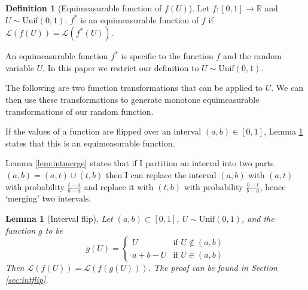 \documentclass[12pt]{article}
\theoremstyle{plain}%
\newtheorem{lemma}[theorem]{Lemma}
\theoremstyle{definition}
\newtheorem{definition}{Definition}[section]
\def\unif{\mathrm{Unif}}
\begin{document}
\begin{definition}[Equimeasurable function of $f(U)$]\label{def:equimeasurable}
	Let $f:[0,1]\to \mathbb{R}$ and $U\sim \unif(0,1)$. $f^*$ is an equimeasurable function of $f$ if $\mathcal{L}(f(U))=\mathcal{L}(f^*(U))$.
\end{definition} 

An equimeasurable function $f^*$ is specific to the function $f$ and the random variable $U$. In this paper we restrict our definition to $U\sim \unif(0,1)$. 

The following are two function transformations that can be applied to $U$. We can then use these transformations to generate monotone equimeasurable transformations of our random function. %

If the values of a function are flipped over an interval $(a,b)\in[0,1]$, Lemma \ref{lem:intflip} states that this is an equimeasurable function.

Lemma \ref{lem:intmerge} states that if I partition an interval into two parts $(a,b)=(a,t)\cup(t,b)$ then I can replace the interval $(a,b)$ with $(a,t)$ with probability $\frac{t-a}{b-a}$ and replace it with $(t,b)$ with probability $\frac{b-t}{b-a}$, hence `merging' two intervals. 
 


\begin{lemma}[Interval flip]\label{lem:intflip}
	Let $(a,b)\subset [0,1]$, $U\sim\unif(0,1)$, and the function $g$ to be 
	\begin{equation}\label{eq:g}
		g(U)=
		\begin{cases}
			U & \text{if } U\notin (a,b)\\
			a+b-U & \text{if } U\in (a,b)
		\end{cases}
	\end{equation}
	 Then $\mathcal{L}(f(U))=\mathcal{L}(f(g(U)))$. %
	The proof can be found in Section \ref{sec:intflip}.
\end{lemma} 
\end{document}
